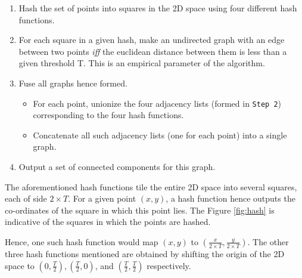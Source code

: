 \begin{enumerate}
\item Hash the set of points into squares in the 2D space using four different hash functions.
\item For each square in a given hash, make an undirected graph with an edge between two points \emph{iff} the euclidean distance between them is less than a given threshold {T}. This is an empirical parameter of the algorithm.
\item Fuse all graphs hence formed.
    \begin{itemize}
        \item For each point, unionize the four adjacency lists (formed in \texttt{Step 2}) corresponding to the four hash functions.
        \item Concatenate all such adjacency lists (one for each point) into a single graph.
    \end{itemize}
\item Output a set of connected components for this graph.
\end{enumerate}
The aforementioned hash functions tile the entire 2D space into several squares, each of side \begin{math}2\times{T}\end{math}. For a given point \begin{math} (x, y) \end{math}, a hash function hence outputs the co-ordinates of the square in which this point lies.
The Figure \ref{fig:hash} is indicative of the squares in which the points are hashed.

Hence, one such hash function would map \begin{math} (x, y) \end{math} to \begin{math} (\frac{x}{2\times{T}}, \frac{y}{2\times{T}}) \end{math}. The other three hash functions mentioned are obtained by shifting the origin of the 2D space to \begin{math}(0, \frac{T}{2}), (\frac{T}{2}, 0) \end{math}, and \begin{math}(\frac{T}{2}, \frac{T}{2})\end{math} respectively.


